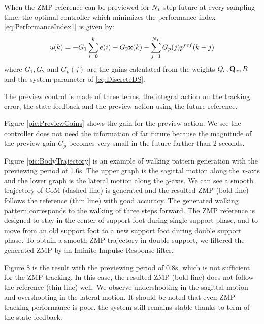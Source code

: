 \par
When the ZMP reference can be previewed for $N_L$ step future at every sampling time,
the optimal controller which minimizes the performance index \ref{eq:PerformanceIndex1}
is given by:
\begin{equation}
u(k) = -G_1 \sum^k_{i=0} e(i) - G_2{\bf x}(k) - \sum^{N_L}_{j=1}G_p(j) p^{ref}(k+j)
\end{equation}
where $G_1, G_2$ and $G_p(j)$ are the gains calculated from the weights $Q_e, {\bf Q}_x, R$
and the system parameter of \ref{eq:DiscreteDS}.
\par
The preview control is made of three terms, the integral action on the tracking error,
the state feedback and the preview action using the future reference.
\par
Figure \ref{pic:PreviewGains} shows the gain for the preview action. We see the controller does not need
the information of far future because the magnitude of the preview gain $G_p$ becomes
very small in the future farther than 2 seconds.
\par
Figure \ref{pic:BodyTrajectory} is an example of walking pattern generation with the previewing period of 1.6s.
The upper graph is the sagittal motion along the $x$-axis and the lower graph is the
lateral motion along the $y$-axis. We can see a smooth trajectory of CoM (dashed line)
is generated and the resulted ZMP (bold line) follows the reference (thin line) with good
accuracy. The generated walking pattern corresponds to the walking of three steps forward.
The ZMP reference is designed to stay in the center of support foot during single
support phase, and to move from an old support foot to a new support foot during double
support phase.
To obtain a smooth ZMP trajectory in double support, we filtered the generated ZMP
by an Infinite Impulse Response filter.
\par
Figure 8 is the result with the previewing period of 0.8s, which is not sufficient for the
ZMP tracking. In this case, the resulted ZMP (bold line) does not follow the reference
(thin line) well. We observe undershooting in the sagittal motion and overshooting in the
lateral motion. It should be noted that even ZMP tracking performance is poor, the
system still remains stable thanks to term of the state feedback.

